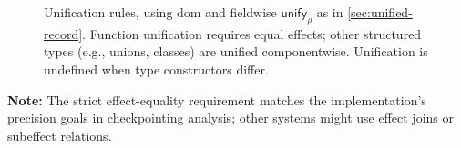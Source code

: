 \begin{figure}[t]
\centering
{}

\caption{Unification rules, using $\mathrm{dom}$ and fieldwise $\mathsf{unify}_{\rho}$ as in \cref{sec:unified-record}. Function unification requires equal effects; other structured types (e.g., unions, classes) are unified componentwise. Unification is undefined when type constructors differ.}
\label{fig:unification}
\end{figure}

\noindent\textbf{Note:} The strict effect-equality requirement matches the implementation’s precision goals in checkpointing analysis; other systems might use effect joins or subeffect relations.

